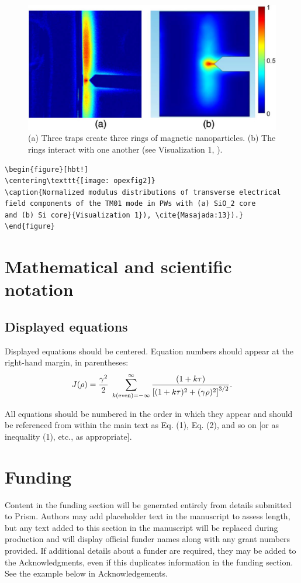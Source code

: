 \documentclass{osa-article}
\begin{document}
\begin{figure}[ht!]
\centering\includegraphics{osafig2}
\caption{(a) Three traps create three rings of magnetic nanoparticles. (b) The rings interact with one another (see \textcolor{urlblue}{Visualization 1}, \cite{Masajada:13}).}
\end{figure}


\begin{verbatim}
\begin{figure}[hbt!]
\centering\texttt{[image: opexfig2]}
\caption{Normalized modulus distributions of transverse electrical
field components of the TM01 mode in PWs with (a) SiO_2 core
and (b) Si core}{Visualization 1}), \cite{Masajada:13}).}
\end{figure}
\end{verbatim}

\section{Mathematical and scientific notation}

\subsection{Displayed equations} Displayed equations should be centered.
Equation numbers should appear at the right-hand margin, in
parentheses:
\begin{equation}
J(\rho) =
 \frac{\gamma^2}{2} \; \sum_{k({\rm even}) = -\infty}^{\infty}
	\frac{(1 + k \tau)}{ \left[ (1 + k \tau)^2 + (\gamma  \rho)^2  \right]^{3/2} }.
\end{equation}

All equations should be numbered in the order in which they appear
and should be referenced  from within the main text as Eq. (1),
Eq. (2), and so on [or as inequality (1), etc., as appropriate].


\section*{Funding}
Content in the funding section will be generated entirely from details submitted to Prism. Authors may add placeholder text in the manuscript to assess length, but any text added to this section in the manuscript will be replaced during production and will display official funder names along with any grant numbers provided. If additional details about a funder are required, they may be added to the Acknowledgments, even if this duplicates information in the funding section. See the example below in Acknowledgements.
\end{document}
